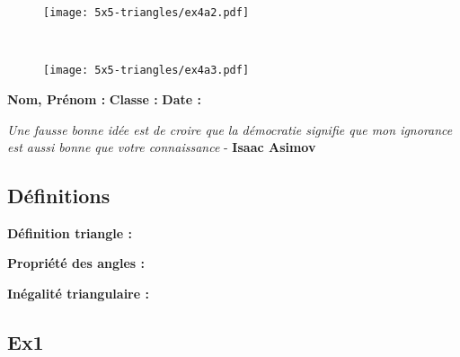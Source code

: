 \begin{minipage}[t]{0.4\textwidth}
  \begin{figure}[H]
    \centering
    \texttt{[image: 5x5-triangles/ex4a2.pdf]}
  \end{figure}
\end{minipage}
\begin{minipage}[t]{0.6\textwidth}
  \Pointilles[10] \\
\end{minipage}

\begin{minipage}[t]{0.4\textwidth}
\begin{figure}[H]
    \centering
    \texttt{[image: 5x5-triangles/ex4a3.pdf]}
  \end{figure} 
\end{minipage}
\begin{minipage}[t]{0.6\textwidth}
  \Pointilles[10]
\end{minipage}

\newpage

\textbf{Nom, Prénom :} \hspace{8cm} \textbf{Classe :} \hspace{3cm} \textbf{Date :}\\
\vspace{-0.8cm}
\begin{center}
  \textit{Une fausse bonne idée est de croire que la démocratie signifie que mon ignorance est aussi bonne que votre connaissance}  - \textbf{Isaac Asimov}
\end{center}
\vspace{-0.8cm}

\subsection*{Définitions}

\textbf{Définition triangle :} \dotfill \\
\Pointilles[1]

\textbf{Propriété des angles :} \dotfill \\
\Pointilles[2]

\textbf{Inégalité triangulaire :} \dotfill \\
\Pointilles[2]


\subsection*{Ex1}

